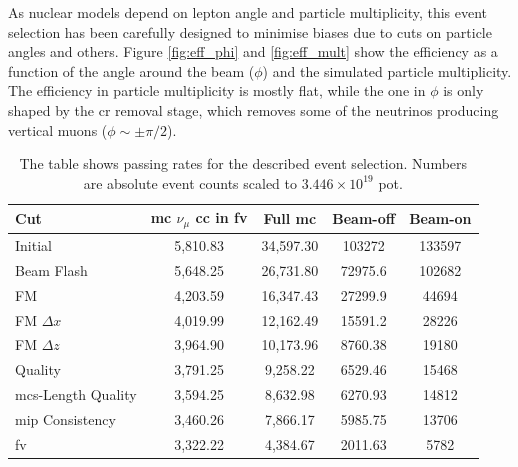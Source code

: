 As nuclear models depend on lepton angle and particle multiplicity, this event selection has been carefully designed to minimise biases due to cuts on particle angles and others. Figure \ref{fig:eff_phi} and \ref{fig:eff_mult} show the efficiency as a function of the angle around the beam ($\phi$) and the \g simulated particle multiplicity. The efficiency in particle multiplicity is mostly flat, while the one in $\phi$ is only shaped by the \acrshort{cr} removal stage, which removes some of the neutrinos producing vertical muons ($\phi \sim \pm \pi/2$).

\begin{table}
\caption[Number of Events Passing Each Event Selection Cut]{The table shows passing rates for the described event selection. Numbers are absolute event counts scaled to $3.446 \times 10^{19}$ \acrshort{pot}.}
\label{tab:pass_rate}
\centering
\begin{tabular}{l c c c c}
\toprule
Cut & \acrshort{mc} $\nu_\mu$ \acrshort{cc} in \acrshort{fv} & Full \acrshort{mc} & Beam-off & Beam-on  \\
\midrule
Initial            & 5,810.83 & 34,597.30 & 103272 & 133597 \\
Beam Flash         & 5,648.25 & 26,731.80 & 72975.6  & 102682 \\
FM                 & 4,203.59 & 16,347.43 & 27299.9  & 44694  \\
FM $\Delta x$      & 4,019.99 & 12,162.49 & 15591.2  & 28226  \\
FM $\Delta z$      & 3,964.90 & 10,173.96 & 8760.38  & 19180  \\
Quality            & 3,791.25 & 9,258.22 & 6529.46   & 15468  \\
\acrshort{mcs}-Length Quality & 3,594.25 & 8,632.98 & 6270.93   & 14812  \\
\acrshort{mip} Consistency    & 3,460.26 & 7,866.17 & 5985.75   & 13706  \\
\acrshort{fv}                 & 3,322.22 & 4,384.67  & 2011.63   & 5782   \\
\bottomrule
\end{tabular}
\end{table}








